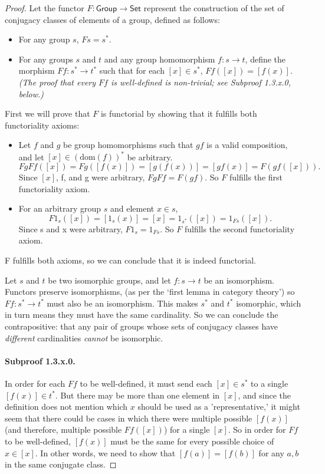 \documentclass[main.tex]{subfiles}
\begin{document}
\begin{proof}
	Let the functor \(F:\mathsf{Group\to Set}\) represent the construction of
	the set of conjugacy classes of elements of a group, defined as follows:
	\begin{itemize}
		\item For any group \(s\), \(Fs = s^*\).

		\item For any groups \(s\) and \(t\) and any group homomorphism
			\(f\colon s\to 	t\), define the morphism \(Ff\colon s^*\to t^*\)
			such that for each \([x]\in s^*\), \(Ff([x]) = [f(x)]\).\smallskip\\
			\textit{\footnotesize (The proof that every \(Ff\) is well-defined
			is non-trivial; see Subproof 1.3.x.0, below.)}
	\end{itemize}

	First we will prove that \(F\) is functorial by showing that it fulfills
	both functoriality axioms:
	\begin{itemize}
		\item Let \(f\) and \(g\) be group homomorphisms such that \(gf\) is a
			valid composition, and let \([x]\in(\textrm{dom}(f))^*\) be
			arbitrary. \[FgFf([x])=Fg([f(x)])=[g(f(x))]=[gf(x)]=F(gf([x])).\]
			Since \([x]\), f, and g were arbitrary, \(FgFf = F(gf)\). So \(F\)
			fulfills the first functoriality axiom.

		\item For an arbitrary group \(s\) and element \(x\in s\),
			\[F1_s([x])=[1_s(x)]=[x]=1_{s^*}([x])=1_{Fs}([x]).\] Since s and x
			were arbitrary, \(F1_{s}=1_{Fs}\). So \(F\) fulfills the second
			functoriality axiom.
	\end{itemize}
	F fulfills both axioms, so we can conclude that it is indeed
	functorial.

	Let \(s\) and \(t\) be two isomorphic groups, and let \(f\colon s\to t\) be
	an isomorphism. Functors preserve isomorphisms, (as per the `first lemma in
	category theory') so \(Ff\colon s^*\to t^*\) must also be an isomorphism.
	This makes \(s^*\) and \(t^*\) isomorphic, which in turn means they must
	have the same cardinality. So we can conclude the contrapositive: that any
	pair of groups whose sets of conjugacy classes have \textit{different}
	cardinalities \textit{cannot} be isomorphic.

	\paragraph*{Subproof 1.3.x.0.} In order for each \(Ff\) to be well-defined,
	it must send each \([x]\in s^*\) to a single \([f(x)]\in t^*\). But there
	may be more than one element in \([x]\), and since the definition does not
	mention which \(x\) should be used as a 'representative,' it might seem that
	there could be cases in which there were multiple possible \([f(x)]\) (and
	therefore, multiple possible \(Ff([x])\)) for a single \([x]\). So in order
	for \(Ff\) to be well-defined, \([f(x)]\) must be the same for every
	possible choice of \(x\in [x]\). In other words, we need to show that
	\([f(a)] = [f(b)]\) for any \(a, b\) in the same conjugate class.


\end{proof}
\end{document}
